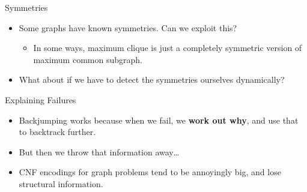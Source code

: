 \documentclass{beamer}
\begin{document}
\begin{frame}{Symmetries}

    \begin{itemize}
        \item Some graphs have known symmetries. Can we exploit this?

            \begin{itemize}
                \item In some ways, maximum clique is just a completely symmetric version of maximum
                    common subgraph.
            \end{itemize}

        \item What about if we have to detect the symmetries ourselves dynamically?
    \end{itemize}

\end{frame}

\begin{frame}{Explaining Failures}

    \begin{itemize}
        \item Backjumping works because when we fail, we \textbf{work out why},
            and use that to backtrack further.

        \item But then we throw that information away\ldots

        \item CNF encodings for graph problems tend to be annoyingly big, and lose structural
            information.
    \end{itemize}

\end{frame}
\end{document}
